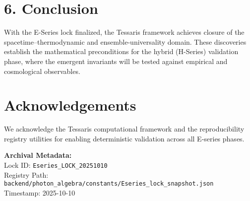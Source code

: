 \documentclass[12pt]{article}
\begin{document}
\section*{6. Conclusion}
With the E-Series lock finalized, the Tessaris framework achieves closure of the spacetime–thermodynamic and ensemble-universality domain.
These discoveries establish the mathematical preconditions for the hybrid (H-Series) validation phase,
where the emergent invariants will be tested against empirical and cosmological observables.

\section*{Acknowledgements}
We acknowledge the Tessaris computational framework and the reproducibility registry utilities for enabling deterministic validation across all E-series phases.

\vspace{1em}
\noindent\textbf{Archival Metadata:}\\
Lock ID: \texttt{Eseries\_LOCK\_20251010}\\
Registry Path: \texttt{backend/photon\_algebra/constants/Eseries\_lock\_snapshot.json}\\
Timestamp: 2025-10-10
\end{document}
